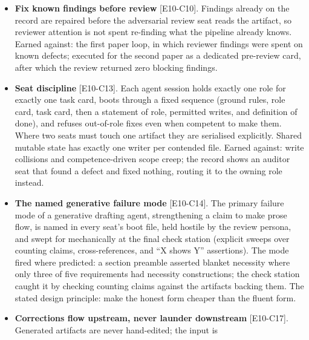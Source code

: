 \documentclass[
  11pt,
]{article}
\begin{document}
\begin{itemize}
  same prominence as a confirmation, and the path record applies the
  same rule to itself: reversals and dead ends are recorded at the same
  prominence as progress. The record's formulation: ``a dead end named
  is a contribution; a dead end omitted is a defect.'' In the second
  instance the rule's compounding value was recorded: a killed-levers
  record kept at win-prominence is what made a closure statement over
  the whole search space possible, because only filed kills make the
  space enumerable.
\item
  \textbf{Fix known findings before review} {[}E10-C10{]}. Findings
  already on the record are repaired before the adversarial review seat
  reads the artifact, so reviewer attention is not spent re-finding what
  the pipeline already knows. Earned against: the first paper loop, in
  which reviewer findings were spent on known defects; executed for the
  second paper as a dedicated pre-review card, after which the review
  returned zero blocking findings.
\item
  \textbf{Seat discipline} {[}E10-C13{]}. Each agent session holds
  exactly one role for exactly one task card, boots through a fixed
  sequence (ground rules, role card, task card, then a statement of
  role, permitted writes, and definition of done), and refuses
  out-of-role fixes even when competent to make them. Where two seats
  must touch one artifact they are serialised explicitly. Shared mutable
  state has exactly one writer per contended file. Earned against: write
  collisions and competence-driven scope creep; the record shows an
  auditor seat that found a defect and fixed nothing, routing it to the
  owning role instead.
\item
  \textbf{The named generative failure mode} {[}E10-C14{]}. The primary
  failure mode of a generative drafting agent, strengthening a claim to
  make prose flow, is named in every seat's boot file, held hostile by
  the review persona, and swept for mechanically at the final check
  station (explicit sweeps over counting claims, cross-references, and
  ``X shows Y'' assertions). The mode fired where predicted: a section
  preamble asserted blanket necessity where only three of five
  requirements had necessity constructions; the check station caught it
  by checking counting claims against the artifacts backing them. The
  stated design principle: make the honest form cheaper than the fluent
  form.
\item
  \textbf{Corrections flow upstream, never launder downstream}
  {[}E10-C17{]}. Generated artifacts are never hand-edited; the input is

\end{itemize}
\end{document}
